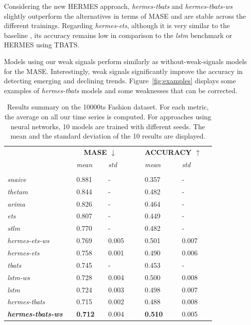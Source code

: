 \documentclass[review]{elsarticle}
\begin{document}
Considering the new HERMES approach, \textit{hermes-tbats} and \textit{hermes-tbats-ws} slightly outperform the alternatives in terms of MASE and are stable across the different trainings. Regarding \textit{hermes-ets},   although it is very similar to the baseline \cite{smyl2020hybrid}, its accuracy remains low in comparison to the \textit{lstm} benchmark or HERMES using TBATS. 

Models using our weak signals perform similarly as without-weak-signals models for the MASE.  Interestingly, weak signals significantly improve the accuracy in detecting emerging and declining trends. Figure~\ref{fig:examples} displays some examples of \textit{hermes-tbats} models and some weaknesses that can be corrected.

\begin{table}
  \caption{Results summary on the 10000ts Fashion dataset. For each metric, the average on all our time series is computed. For approaches using neural networks, 10 models are trained with different seeds. The mean and the standard deviation of the 10 results are displayed.}
  \centering
  \begin{tabular}{l||lllll|lllll}
   &&\multicolumn{3}{c}{\textbf{MASE $\downarrow$}} &&& \multicolumn{3}{c}{\textbf{ACCURACY $\uparrow$}}&\\
    &&  \textit{mean}  && \textit{std} &&&  \textit{mean}  && \textit{std}& \\
	 \hline
	 &&&&&&&&&&\\
     \textit{snaive} && 0.881 && - &&& 0.357 && - &\\
     \textit{thetam}  && 0.844 && -&&& 0.482 && - &\\
     \textit{arima} && 0.826 && -&&& 0.464 && - & \\
     \textit{ets} && 0.807 && -&&& 0.449 && - & \\
     \textit{stlm} && 0.770 && -&&& 0.482 && - & \\
     \textit{hermes-ets-ws} && 0.769 && 0.005 &&& 0.501 && 0.007 &\\
     \textit{hermes-ets} && 0.758 && 0.001 &&& 0.490 && 0.006 &\\
     \textit{tbats} && 0.745 && -&&& 0.453 && - & \\
     \textit{lstm-ws} && 0.728 && 0.004 &&& 0.500 && 0.008 &\\
     \textit{lstm} && 0.724 && 0.003 &&& 0.498 && 0.007 &\\
     \textit{hermes-tbats} && 0.715 && 0.002 &&& 0.488 && 0.008 &\\
     \textbf{\textit{hermes-tbats-ws}} && \textbf{0.712} && 0.004 &&& \textbf{0.510} && 0.005 &\\
  \end{tabular}
\label{tab:metricresults}
\end{table}
\end{document}
